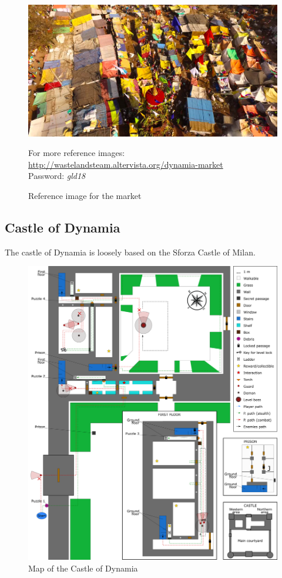 \begin{figure}[H]
  \centering
  \includegraphics[width=\textwidth]{Images/Landmarks/market}

  \caption{Reference image for the market}
    For more reference images: \href{http://wastelandsteam.altervista.org/dynamia-dead-end}{http://wastelandsteam.altervista.org/dynamia-market}\\Password: \textit{gld18}
\end{figure}
\subsection{Castle of Dynamia}
The castle of Dynamia is loosely based on the Sforza Castle of Milan.

\begin{figure}[H]
  \centering
  \includegraphics[width=\textwidth]{Images/Maps/castleOfDynamia}
  \caption{Map of the Castle of Dynamia}
  
\end{figure}

